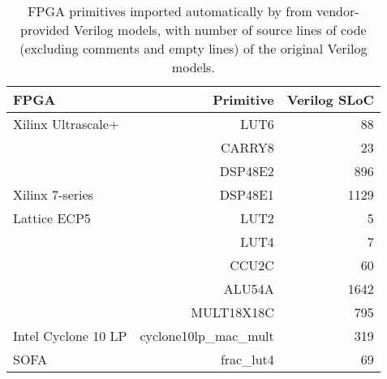 
\begin{table}
\caption{
FPGA primitives imported 
  automatically by \lr from vendor-provided 
  Verilog models, with number of source lines of code 
  (excluding comments and empty lines) of 
  the original Verilog models.} 
\centering
\footnotesize
\label{table:imported-primitves}
\begin{tabular}{lrr}
 {\bf FPGA}   & \textbf{Primitive} & {\bf Verilog SLoC} \\\hline
 Xilinx Ultrascale+  & LUT6 & 88       \\
                     & CARRY8 & 23       \\
                     & DSP48E2 & 896       \\
                     \hline
 Xilinx 7-series
                     
                     & DSP48E1 & 1129       \\
                     \hline
 Lattice ECP5 & LUT2 & 5       \\
              & LUT4 & 7       \\
              & CCU2C & 60       \\
              & ALU54A & 1642 \\ 
              & MULT18X18C & 795 \\
              \hline
 Intel Cyclone 10 LP  & cyclone10lp\_mac\_mult   &  319       \\ 
              \hline
 SOFA      & frac\_lut4   &  69       \\ 
\end{tabular}
\end{table}










